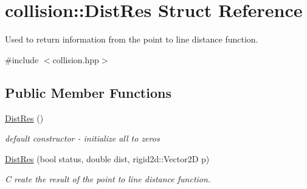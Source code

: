 \hypertarget{structcollision_1_1DistRes}{}\section{collision\+:\+:Dist\+Res Struct Reference}
\label{structcollision_1_1DistRes}


Used to return information from the point to line distance function.  




{\ttfamily \#include $<$collision.\+hpp$>$}

\subsection*{Public Member Functions}
\begin{DoxyCompactItemize}
\item 
\mbox{\label{structcollision_1_1DistRes_ad71547d7a27b03b93e37fe5801ded765}} 
\hyperlink{structcollision_1_1DistRes_ad71547d7a27b03b93e37fe5801ded765}{Dist\+Res} ()
\begin{DoxyCompactList}\small\item\em default constructor -\/ initialize all to zeros \end{DoxyCompactList}\item 
\hyperlink{structcollision_1_1DistRes_aa410e45b30d3371699c3bc4b97293437}{Dist\+Res} (bool status, double dist, rigid2d\+::\+Vector2D p)
\begin{DoxyCompactList}\small\item\em C reate the result of the point to line distance function. \end{DoxyCompactList}\end{DoxyCompactItemize}
